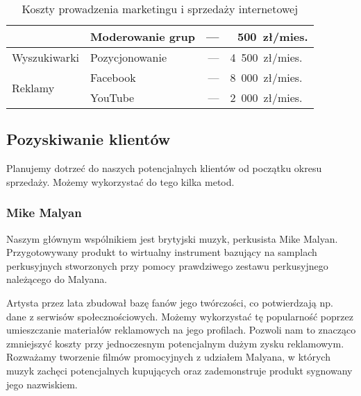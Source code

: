 \documentclass[12pt]{article}
\begin{document}
\begin{table}[h!]
\begin{center}
{\begin{tabular}{llrr}
     & Moderowanie grup   & ---    & 500~zł/mies.   \\
 \midrule
     \multirow{1}{*}{Wyszukiwarki}
     & Pozycjonowanie & --- & 4~500~zł/mies.~\cite{pozycjonowanie} \\
 \midrule
     \multirow{2}{*}{Reklamy}
     & Facebook   & --- & 8~000~zł/mies.~\cite{facebook} \\
     & YouTube    & --- & 2~000~zł/mies.~\cite{youtube}  \\
 \bottomrule
 \end{tabular}}
 \caption{Koszty prowadzenia marketingu i sprzedaży internetowej}
 \label{table:marketing-sprzedaz}
 \end{center}
\end{table}

\subsection{Pozyskiwanie klientów}


Planujemy dotrzeć do naszych potencjalnych klientów od początku okresu sprzedaży.
Możemy wykorzystać do tego kilka metod.

\subsubsection{Mike Malyan}


Naszym głównym wspólnikiem jest brytyjski muzyk, perkusista Mike Malyan.
Przygotowywany produkt to wirtualny instrument bazujący na samplach perkusyjnych stworzonych przy pomocy prawdziwego zestawu perkusyjnego należącego do Malyana.

Artysta przez lata zbudował bazę fanów jego twórczości, co potwierdzają np. dane z serwisów społecznościowych.
Możemy wykorzystać tę popularność poprzez umieszczanie materiałów reklamowych na jego profilach.
Pozwoli nam to znacząco zmniejszyć koszty przy jednoczesnym potencjalnym dużym zysku reklamowym.
Rozważamy tworzenie filmów promocyjnych z udziałem Malyana, w których muzyk zachęci potencjalnych kupujących oraz zademonstruje produkt sygnowany jego nazwiskiem.
\end{document}
